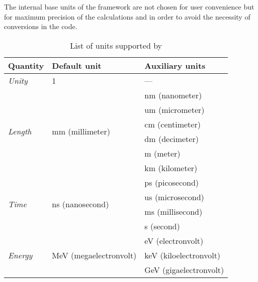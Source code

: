 The internal base units of the framework are not chosen for user convenience but for maximum precision of the calculations and in order to avoid the necessity of conversions in the code.

\begin{table}[tbp]
\caption{List of units supported by \apsq}
\label{tab:units}
\centering
\begin{tabular}{lll}
  \toprule
\textbf{Quantity}                 & \textbf{Default unit}                   & \textbf{Auxiliary units} \\
 \midrule
 \textit{Unity}                   & 1                                       & ---                      \\
 \midrule
 \multirow{6}{*}{\textit{Length}} & \multirow{6}{*}{mm (millimeter)}        & nm (nanometer)           \\
                                  &                                         & um (micrometer)          \\
                                  &                                         & cm (centimeter)          \\
                                  &                                         & dm (decimeter)           \\
                                  &                                         & m (meter)                \\
                                  &                                         & km (kilometer)           \\
 \midrule
\multirow{4}{*}{\textit{Time}}    & \multirow{4}{*}{ns (nanosecond)}        & ps (picosecond)          \\
                                  &                                         & us (microsecond)         \\
                                  &                                         & ms (millisecond)         \\
                                  &                                         & s (second)               \\
\midrule
\multirow{3}{*}{\textit{Energy}}  & \multirow{3}{*}{MeV (megaelectronvolt)} & eV (electronvolt)        \\
                                  &                                         & keV (kiloelectronvolt)   \\
                                  &                                         & GeV (gigaelectronvolt)   \\

\end{tabular}
\end{table}
